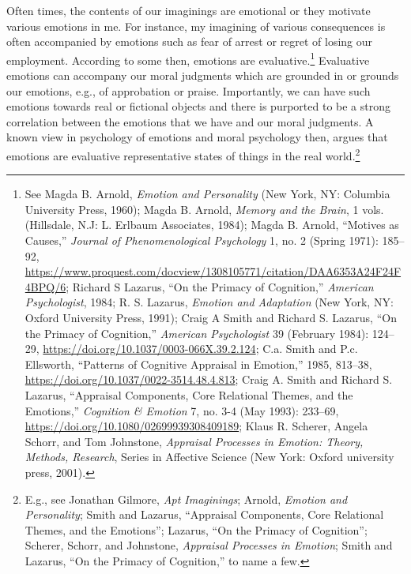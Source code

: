 \documentclass[phdthesis,12pt,final]{wuthesis}
\theoremstyle{definition}
\theoremstyle{definition}
\theoremstyle{definition}
\theoremstyle{definition}
\theoremstyle{remark}
\begin{document}
Often times, the contents of our imaginings are emotional or they motivate various emotions in me. For instance, my imagining of various consequences is often accompanied by emotions such as fear of arrest or regret of losing our employment. According to some then, emotions are evaluative.\footnote{See Magda B. Arnold, \emph{Emotion and {Personality}} (New York, NY: Columbia University Press, 1960); Magda B. Arnold, \emph{Memory and the Brain}, 1 vols. (Hillsdale, N.J: L. Erlbaum Associates, 1984); Magda B. Arnold, {``Motives as Causes,''} \emph{Journal of Phenomenological Psychology} 1, no. 2 (Spring 1971): 185--92, \url{https://www.proquest.com/docview/1308105771/citation/DAA6353A24F24F4BPQ/6}; Richard S Lazarus, {``On the {Primacy} of {Cognition},''} \emph{American Psychologist}, 1984; R. S. Lazarus, \emph{Emotion and Adaptation} (New York, NY: Oxford University Press, 1991); Craig A Smith and Richard S. Lazarus, {``On the {Primacy} of {Cognition},''} \emph{American Psychologist} 39 (February 1984): 124--29, \url{https://doi.org/10.1037/0003-066X.39.2.124}; C.a. Smith and P.c. Ellsworth, {``Patterns of {Cognitive Appraisal} in {Emotion},''} 1985, 813--38, \url{https://doi.org/10.1037/0022-3514.48.4.813}; Craig A. Smith and Richard S. Lazarus, {``Appraisal {Components}, {Core Relational Themes}, and the {Emotions},''} \emph{Cognition \& Emotion} 7, no. 3-4 (May 1993): 233--69, \url{https://doi.org/10.1080/02699939308409189}; Klaus R. Scherer, Angela Schorr, and Tom Johnstone, \emph{Appraisal Processes in Emotion: Theory, Methods, Research}, Series in Affective Science (New York: Oxford university press, 2001).} Evaluative emotions can accompany our moral judgments which are grounded in or grounds our emotions, e.g., of approbation or praise. Importantly, we can have such emotions towards real or fictional objects and there is purported to be a strong correlation between the emotions that we have and our moral judgments. A known view in psychology of emotions and moral psychology then, argues that emotions are evaluative representative states of things in the real world.\footnote{E.g., see Jonathan Gilmore, \emph{Apt {Imaginings}}; Arnold, \emph{Emotion and {Personality}}; Smith and Lazarus, {``Appraisal {Components}, {Core Relational Themes}, and the {Emotions}''}; Lazarus, {``On the {Primacy} of {Cognition}''}; Scherer, Schorr, and Johnstone, \emph{Appraisal Processes in Emotion}; Smith and Lazarus, {``On the {Primacy} of {Cognition},''} to name a few.}
\end{document}
